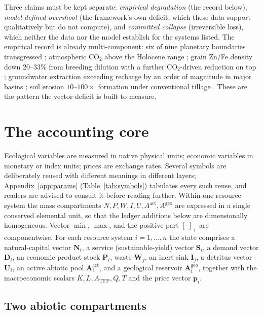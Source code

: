 \documentclass[11pt]{article}
\theoremstyle{definition}
\begin{document}
Three claims must be kept separate: \emph{empirical degradation} (the record below), \emph{model-defined overshoot} (the framework's own deficit, which these data support qualitatively but do not compute), and \emph{committed collapse} (irreversible loss), which neither the data nor the model establish for the systems listed. The empirical record is already multi-component: six of nine planetary boundaries transgressed \cite{richardson2023}; atmospheric $\mathrm{CO}_2$ above the Holocene range \cite{ipcc2021}; grain Zn/Fe density down $20$--$33\%$ from breeding dilution \cite{fan2008,debnath2023} with a further $\mathrm{CO}_2$-driven reduction on top \cite{myers2014}; groundwater extraction exceeding recharge by an order of magnitude in major basins \cite{famiglietti2014,rodell2018}; soil erosion $10$--$100\times$ formation under conventional tillage \cite{montgomery2007}. These are the pattern the vector deficit is built to measure.

\section{The accounting core}
\label{sec:accounting}

Ecological variables are measured in native physical units; economic variables in monetary or index units; prices are exchange rates. Several symbols are deliberately reused with different meanings in different layers; Appendix~\ref{app:params} (Table~\ref{tab:symbols}) tabulates every such reuse, and readers are advised to consult it before reading further. Within one resource system the mass compartments $N,P,W,I,U,A^{\mathrm{act}},A^{\mathrm{geo}}$ are expressed in a single conserved elemental unit, so that the ledger additions below are dimensionally homogeneous. Vector $\min$, $\max$, and the positive part $[\cdot]_+$ are componentwise. For each resource system $i=1,\dots,n$ the state comprises a natural-capital vector $\mathbf N_i$, a service (sustainable-yield) vector $\mathbf S_i$, a demand vector $\mathbf D_i$, an economic product stock $\mathbf P_i$, waste $\mathbf W_j$, an inert sink $\mathbf I_j$, a detritus vector $\mathbf U_i$, an active abiotic pool $\mathbf A^{\mathrm{act}}_i$, and a geological reservoir $\mathbf A^{\mathrm{geo}}_i$, together with the macroeconomic scalars $K,L,A_{\mathrm{TFP}},Q,T$ and the price vector $\mathbf p_i$.

\subsection{Two abiotic compartments}
\label{sec:abiotic}
\end{document}
